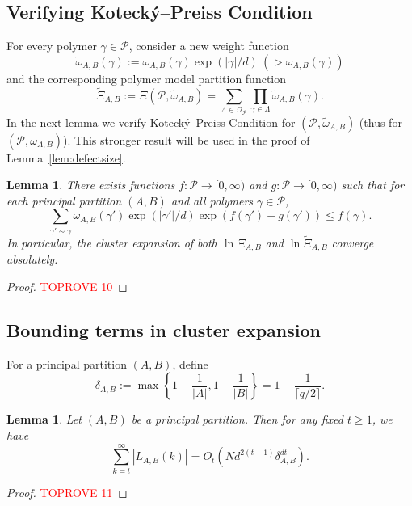 \documentclass{amsart}
\newtheorem{lem}[thm]{Lemma}
\theoremstyle{definition}
\newcommand{\bO}{O}
\newcommand{\we}{\omega}
\newcommand{\cP}{\mathcal{P} }
\newcommand{\0}[0]{\emptyset}
\begin{document}
\subsection{Verifying Koteck\'{y}--Preiss Condition}

For every polymer $\gamma\in\cP$, consider a new weight function
\[
\tilde{\we}_{A,B}(\gamma):=\we_{A,B}(\gamma)\exp(|\gamma|/d)~(>\we_{A,B}(\gamma))
\]
and the corresponding polymer model partition function
\begin{equation}\label{def:genepmodel}
\tilde{\Xi}_{A,B}:=\Xi(\cP, \tilde{\we}_{A, B})=\sum_{\Lambda\in\Omega_{\cP}}\prod_{\gamma\in\Lambda}\tilde{\we}_{A, B}(\gamma).
\end{equation}
In the next lemma we verify Koteck\'{y}--Preiss Condition for $(\cP, \tilde \we_{A, B})$ (thus for $(\cP, {\we}_{A,B})$). This stronger result will be used in the proof of Lemma~\ref{lem:defectsize}.
\begin{lem}\label{lem:KP}
There exists functions $f: \cP \rightarrow [0, \infty)$ and $g: \cP \rightarrow [0, \infty)$ such that for each principal partition $(A, B)$ and all polymers $\gamma\in\cP$,
\begin{equation}\label{eq:kot-thm}
\sum_{\gamma'\sim \gamma}\we_{A, B}(\gamma')\exp(|\gamma'|/d)\exp\left(f(\gamma')+g(\gamma')\right)\leq f(\gamma).
\end{equation}
In particular, the cluster expansion of both $\ln\Xi_{A, B}$ and $\ln\tilde{\Xi}_{A, B}$ converge absolutely.
\end{lem}
\begin{proof}\textcolor{red}{TOPROVE 10}\end{proof}

\subsection{Bounding terms in cluster expansion} For a principal partition $(A, B)$, define
\[
\delta_{A, B}:=\max\left\{1 - \frac{1}{|A|}, 1 - \frac{1}{|B|}\right\}=1 - \frac{1}{\lceil q/2 \rceil}.
\]

\begin{lem}\label{lem:erroresti}
Let $(A, B)$ be a principal partition. Then for any fixed $t\geq 1$, we have 
\[
\sum_{k=t}^{\infty}|L_{A, B}(k)|=\bO_t\left(Nd^{2(t-1)}\delta_{A, B}^{dt}\right).
\]
\end{lem}
\begin{proof}\textcolor{red}{TOPROVE 11}\end{proof}
\end{document}

